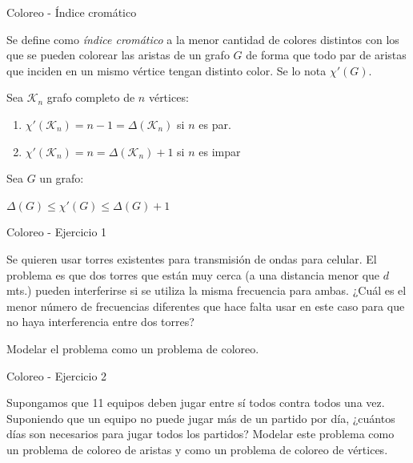 \documentclass[10pt]{beamer}
\newcommand \anchoPagina{1.0} %
\begin{document}
\begin{frame}{Coloreo - \'Indice crom\'atico}
	\begin{minipage}{\anchoPagina \textwidth}
	\small
		Se define como \textit{\'indice crom\'atico} a la menor cantidad de colores distintos con los que se pueden colorear las aristas de un grafo $G$ de forma que todo par de aristas que inciden en un mismo v\'ertice tengan distinto color. Se lo nota $\chi'(G)$.
		\vspace{0.2cm}
        \begin{tcolorbox}[title=Propiedades]
        Sea $\mathcal{K}_n$ grafo completo de $n$ vértices:
        \begin{enumerate}
            \item $\chi'(\mathcal{K}_n) = n-1 = \Delta(\mathcal{K}_n)$ si $n$ es par.
            \item $\chi'(\mathcal{K}_n) = n = \Delta(\mathcal{K}_n)+1$ si $n$ es impar
        \end{enumerate}
        \end{tcolorbox}
        \vspace{0.2cm}
		\begin{tcolorbox}[title=Teorema de Vizing]
		Sea $G$ un grafo:
		
		$\Delta(G) \leq \chi'(G) \leq  \Delta(G) + 1$
		\end{tcolorbox}
	\end{minipage}
\end{frame}

\begin{frame}{Coloreo - Ejercicio 1}
	\begin{minipage}{\anchoPagina \textwidth}
		Se quieren usar torres existentes para transmisi\'on de ondas para celular. El problema es que dos torres que est\'an muy cerca (a una distancia menor que $d$ mts.) pueden interferirse si se utiliza la misma frecuencia para ambas. ¿Cu\'al es el menor n\'umero de frecuencias diferentes que hace falta usar en este caso para que no haya interferencia entre dos torres?
		
		Modelar el problema como un problema de coloreo.
	\end{minipage}
\end{frame}


\begin{frame}{Coloreo - Ejercicio 2}
	\begin{minipage}{\anchoPagina \textwidth}
		Supongamos que 11 equipos deben jugar entre s\'i todos contra todos una vez. Suponiendo que un equipo no puede jugar m\'as de un partido por d\'ia, ¿cu\'antos d\'ias son necesarios para jugar todos los partidos? Modelar este problema como un problema de coloreo de aristas y como un problema de coloreo de v\'ertices.
	\end{minipage}
\end{frame}
\end{document}
